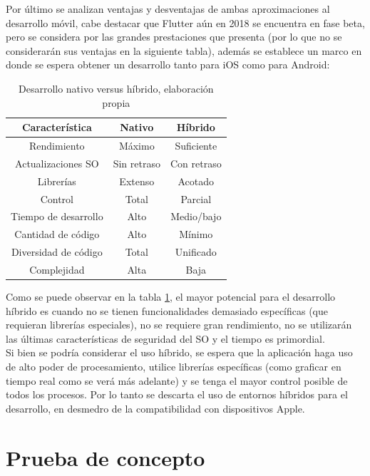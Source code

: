 Por último se analizan ventajas y desventajas de ambas aproximaciones al desarrollo móvil, cabe destacar que Flutter aún en 2018 se encuentra en fase beta, pero se considera por las grandes prestaciones que presenta (por lo que no se considerarán sus ventajas en la siguiente tabla), además se establece un marco en donde se espera obtener un desarrollo tanto para iOS como para Android:

\begin{table}[H]
	\centering
	\begin{tabular}{| c | c | c |}
		\hline
		\multicolumn{1}{|c|}{\textbf{Característica}}&
		\multicolumn{1}{c|}{\textbf{Nativo}}&
		\multicolumn{1}{|c|}{\textbf{Híbrido}}\\ \hline
		Rendimiento  & Máximo  & Suficiente \\ \hline
		Actualizaciones SO  & Sin retraso & Con retraso \\ \hline
		Librerías  & Extenso & Acotado \\ \hline
		Control  & Total & Parcial \\ \hline
		Tiempo de desarrollo  & Alto & Medio/bajo \\ \hline
		Cantidad de código  & Alto & Mínimo \\ \hline
		Diversidad de código  & Total & Unificado \\ \hline
		Complejidad  & Alta & Baja \\ \hline
	\end{tabular}
	\caption{Desarrollo nativo versus híbrido, elaboración propia}
	\label{native_hybrid}
\end{table}

Como se puede observar en la tabla \ref{native_hybrid}, el mayor potencial para el desarrollo híbrido es cuando no se tienen funcionalidades demasiado específicas (que requieran librerías especiales), no se requiere gran rendimiento, no se utilizarán las últimas características de seguridad del SO y el tiempo es primordial.\\
Si bien se podría considerar el uso híbrido, se espera que la aplicación haga uso de alto poder de procesamiento, utilice librerías específicas (como graficar en tiempo real como se verá más adelante) y se tenga el mayor control posible de todos los procesos. Por lo tanto se descarta el uso de entornos híbridos para el desarrollo, en desmedro de la compatibilidad con dispositivos Apple.


\newpage
\section{Prueba de concepto}

